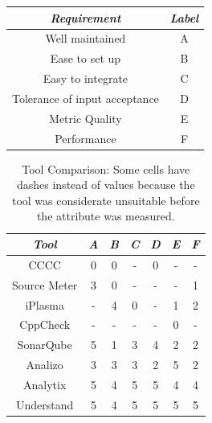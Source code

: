 \begin{table}[ht]
	\centering
	\begin{tabular}{c|c}
		\hline
		\textit{Requirement}          & \textit{Label} \\
		\hline
		\hline
		Well maintained               & A              \\
		Ease to set up                & B              \\
		Easy to integrate             & C              \\
		Tolerance of input acceptance & D              \\
		Metric Quality                & E              \\
		Performance                   & F              \\
		\hline
	\end{tabular}
	\label{tbl:ex1}
\end{table}

\begin{table}[H]
	\centering
	\caption{Tool Comparison: Some cells have dashes instead of values because the tool was considerate unsuitable before the attribute was measured.}
	\label{tab:comp}
	\begin{tabular}{c|c|c|c|c|c|c}
		\hline
		\textit{Tool} & \textit{A} & \textit{B} & \textit{C} & \textit{D} & \textit{E} & \textit{F} \\
		\hline
    \hline
		CCCC          & 0          & 0          & -          & 0          & -          & -          \\
		Source Meter  & 3          & 0          & -          & -          & -          & 1          \\
		iPlasma       & -          & 4          & 0          & -          & 1          & 2          \\
		CppCheck      & -          & -          & -          & -          & 0          & -          \\
		SonarQube     & 5          & 1          & 3          & 4          & 2          & 2          \\
		Analizo       & 3          & 3          & 3          & 2          & 5          & 2          \\
		Analytix      & 5          & 4          & 5          & 5          & 4          & 4          \\
		Understand    & 5          & 4          & 5          & 5          & 5          & 5          \\
    \hline
  \end{tabular}
\end{table}

